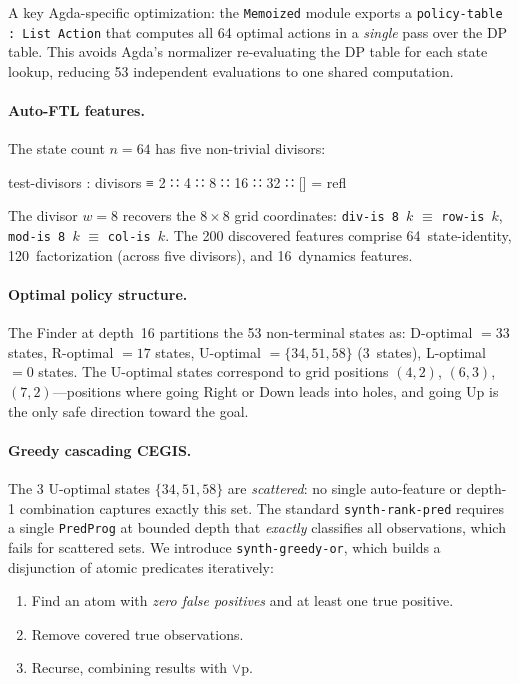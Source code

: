 A key Agda-specific optimization: the \texttt{Memoized} module exports a \texttt{policy-table : List~Action} that computes all 64 optimal actions in a \emph{single} pass over the DP table.  This avoids Agda's normalizer re-evaluating the DP table for each state lookup, reducing 53 independent evaluations to one shared computation.

\paragraph{Auto-FTL features.}
The state count $n = 64$ has five non-trivial divisors:

\begin{spec}
test-divisors : divisors ≡ 2 ∷ 4 ∷ 8 ∷ 16 ∷ 32 ∷ []    = refl
\end{spec}

\noindent The divisor $w = 8$ recovers the $8{\times}8$ grid coordinates: \texttt{div-is~8~$k$} $\equiv$ \texttt{row-is~$k$}, \texttt{mod-is~8~$k$} $\equiv$ \texttt{col-is~$k$}.  The 200 discovered features comprise 64~state-identity, 120~factorization (across five divisors), and 16~dynamics features.

\paragraph{Optimal policy structure.}
The Finder at depth~16 partitions the 53 non-terminal states as: D-optimal $= 33$ states, R-optimal $= 17$ states, U-optimal $= \{34, 51, 58\}$ (3~states), L-optimal $= 0$ states.  The U-optimal states correspond to grid positions $(4,2)$, $(6,3)$, $(7,2)$---positions where going Right or Down leads into holes, and going Up is the only safe direction toward the goal.

\paragraph{Greedy cascading CEGIS.}
The 3 U-optimal states $\{34, 51, 58\}$ are \emph{scattered}: no single auto-feature or depth-1 combination captures exactly this set.  The standard \texttt{synth-rank-pred} requires a single \texttt{PredProg} at bounded depth that \emph{exactly} classifies all observations, which fails for scattered sets.  We introduce \texttt{synth-greedy-or}, which builds a disjunction of atomic predicates iteratively:
\begin{enumerate}
\item Find an atom with \emph{zero false positives} and at least one true positive.
\item Remove covered true observations.
\item Recurse, combining results with $\vee$p.
\end{enumerate}


